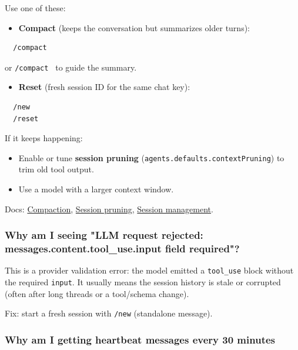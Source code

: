 Use one of these:

\begin{itemize}
  \item \textbf{Compact} (keeps the conversation but summarizes older turns):
\end{itemize}


\begin{lstlisting}
  /compact
\end{lstlisting}


or \texttt{/compact } to guide the summary.

\begin{itemize}
  \item \textbf{Reset} (fresh session ID for the same chat key):
\end{itemize}


\begin{lstlisting}
  /new
  /reset
\end{lstlisting}


If it keeps happening:

\begin{itemize}
  \item Enable or tune \textbf{session pruning} (\texttt{agents.defaults.contextPruning}) to trim old tool output.
  \item Use a model with a larger context window.
\end{itemize}


Docs: \href{/concepts/compaction}{Compaction}, \href{/concepts/session-pruning}{Session pruning}, \href{/concepts/session}{Session management}.

\subsubsection{Why am I seeing "LLM request rejected: messages.content.tool\_use.input field required"?}


This is a provider validation error: the model emitted a \texttt{tool\_use} block without the required
\texttt{input}. It usually means the session history is stale or corrupted (often after long threads
or a tool/schema change).

Fix: start a fresh session with \texttt{/new} (standalone message).

\subsubsection{Why am I getting heartbeat messages every 30 minutes}


